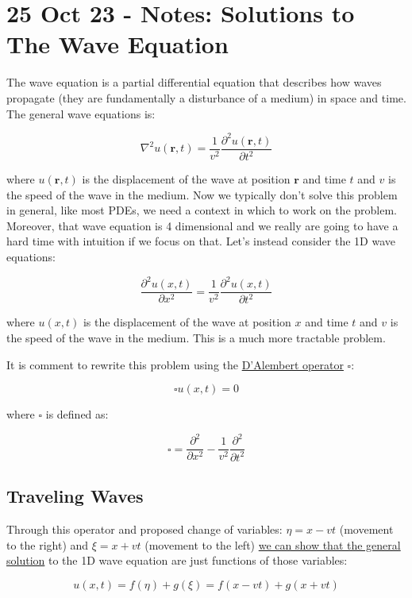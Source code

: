 \section{25 Oct 23 - Notes: Solutions to The Wave
Equation}\label{oct-23---notes-solutions-to-the-wave-equation}

The wave equation is a partial differential equation that describes how
waves propagate (they are fundamentally a disturbance of a medium) in
space and time. The general wave equations is:

\[\nabla^2 u(\mathbf{r},t) = \frac{1}{v^2} \frac{\partial^2 u(\mathbf{r},t)}{\partial t^2}\]

where \(u(\mathbf{r},t)\) is the displacement of the wave at position
\(\mathbf{r}\) and time \(t\) and \(v\) is the speed of the wave in the
medium. Now we typically don't solve this problem in general, like most
PDEs, we need a context in which to work on the problem. Moreover, that
wave equation is 4 dimensional and we really are going to have a hard
time with intuition if we focus on that. Let's instead consider the 1D
wave equations:

\[\frac{\partial^2 u(x,t)}{\partial x^2} = \frac{1}{v^2} \frac{\partial^2 u(x,t)}{\partial t^2}\]

where \(u(x,t)\) is the displacement of the wave at position \(x\) and
time \(t\) and \(v\) is the speed of the wave in the medium. This is a
much more tractable problem.

It is comment to rewrite this problem using the
\href{https://en.wikipedia.org/wiki/D\%27Alembert_operator}{D'Alembert
operator} \(\square\):

\[\square u(x,t) = 0\]

where \(\square\) is defined as:

\[\square = \frac{\partial^2}{\partial x^2} - \frac{1}{v^2} \frac{\partial^2}{\partial t^2}\]

\subsection{Traveling Waves}\label{traveling-waves}

Through this operator and proposed change of variables:
\(\eta = x - vt\) (movement to the right) and \(\xi = x + vt\) (movement
to the left) \href{https://inv.tux.pizza/watch?v=Sc21aPg2RyE}{we can
show that the general solution} to the 1D wave equation are just
functions of those variables:

\[u(x,t) = f(\eta) + g(\xi) = f(x-vt) + g(x+vt)\]

